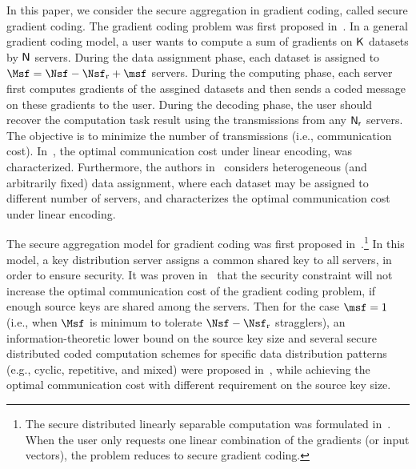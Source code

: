 \documentclass[conference,letterpaper]{IEEEtran}
\begin{document}
In this paper, we consider the secure aggregation in gradient coding, called secure gradient coding. 
The gradient coding problem was first proposed in~\cite{pmlr-v70-tandon17a}. 
In a general gradient coding model, a user wants to compute a sum of gradients on   ${\sf K}$ datasets by ${\sf N}$ servers. During the data assignment phase, each dataset is assigned to $\Msf = \Nsf - \Nsf_{\rm r} + \msf$  servers.  During the computing phase, each server first computes gradients of the assgined datasets and then sends a coded message on these gradients to the user. During the decoding phase, the user should  recover the computation task result using the transmissions from any ${\sf N_r}$ servers. The objective is to minimize the number of transmissions (i.e., communication cost). 
In~\cite{ye2018communication}, the optimal communication cost under   linear encoding,  was characterized. 
Furthermore, the authors in~\cite{Heterogeneous_Gradient_Coding} considers  heterogeneous (and arbitrarily fixed) data assignment, where each dataset may be assigned to different number of servers,  and 
characterizes the  optimal communication cost  under   linear encoding. 

The secure aggregation model for gradient coding was first proposed in~\cite{wan2022secure}.\footnote{\label{foot:linearly separable}The secure distributed linearly separable computation was formulated in~\cite{wan2022secure}. When the user only requests one linear combination of the gradients (or input vectors),  the problem reduces to secure gradient coding.} %
In this model, a key distribution server assigns a common shared key to all servers, in order to ensure  security.
It was proven in~\cite{wan2022secure} that the security constraint will not increase the optimal
communication cost of the gradient coding problem, if enough
source keys are shared among the servers. Then 
for the case  $\msf=1$ (i.e., when $\Msf$ is minimum to tolerate $\Nsf-\Nsf_{\rm r}$ stragglers), an information-theoretic lower bound on the source key size and  several secure distributed coded computation schemes for specific data distribution patterns (e.g., cyclic, repetitive, and mixed) were proposed in~\cite{wan2022secure},  while achieving the optimal communication cost with different requirement on the source key size. 
\end{document}
